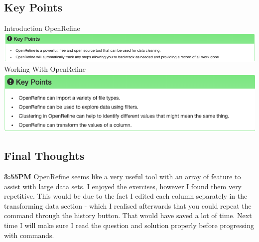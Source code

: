 \documentclass{article}
\begin{document}
\subsection{Key Points}
Introduction OpenRefine \\
\includegraphics[width=\textwidth]{Images/OpenRefine_1.png} \\
Working With OpenRefine \\
\includegraphics[width=\textwidth]{Images/OpenRefine_2.png}

\subsection{Final Thoughts}
\textbf{3:55PM} OpenRefine seems like a very useful tool with an array of feature to assist with large data sets. I enjoyed the exercises, however I found them very repetitive. This would be due to the fact I edited each column separately in the transforming data section - which I realised afterwards that you could repeat the command through the history button. That would have saved a lot of time. Next time I will make sure I read the question and solution properly before progressing with commands. 
\end{document}
